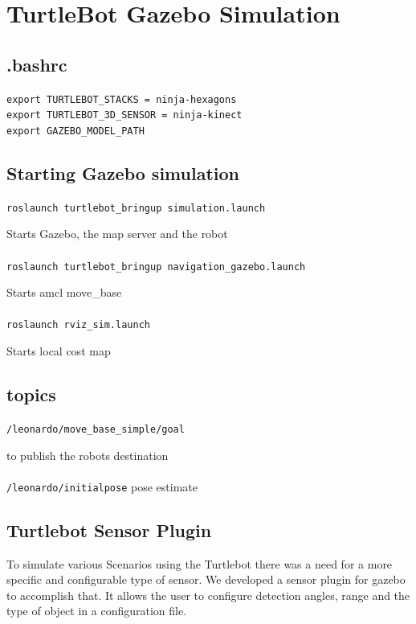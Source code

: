 \chapter{TurtleBot Gazebo Simulation}
\label{chap:TurtleBotGazeboSimulation}

	
\section{.bashrc}
	\texttt{export TURTLEBOT\_STACKS = ninja-hexagons}
	\\
	\texttt{export TURTLEBOT\_3D\_SENSOR = ninja-kinect}
	\\
	\texttt{export GAZEBO\_MODEL\_PATH}


\section{Starting Gazebo simulation}

\texttt{roslaunch turtlebot\_bringup simulation.launch}
	
	Starts Gazebo, the map server and the robot	
	\\	
	\\	
		
\texttt{roslaunch turtlebot\_bringup navigation\_gazebo.launch}
	
	Starts amcl move\_base
	\\
	\\
	
\texttt{roslaunch rviz\_sim.launch}
	
	Starts local cost map

\section{topics}

\texttt{/leonardo/move\_base\_simple/goal}

	to publish the robots destination
\\
\\
\texttt{/leonardo/initialpose}
	pose estimate	


\section{Turtlebot Sensor Plugin}

To simulate various Scenarios using the Turtlebot there was a need for a more specific and configurable type of sensor. We developed a sensor plugin for gazebo to accomplish that. It allows the user to configure detection angles, range and the type of object in a configuration file. 

